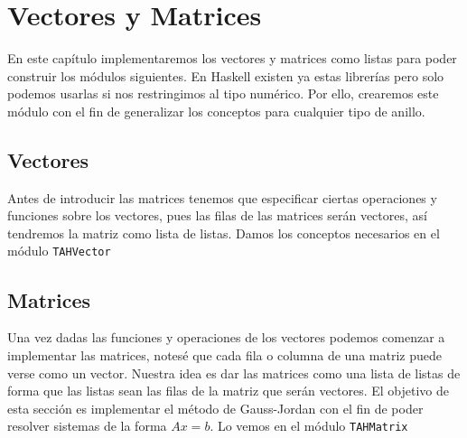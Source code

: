 \chapter{Vectores y Matrices}\label{sec:matrixHas}
En este capítulo implementaremos los vectores y matrices como listas para poder construir los módulos siguientes. En Haskell existen ya estas librerías pero solo podemos usarlas si nos restringimos al tipo numérico. Por ello, crearemos este módulo con el fin de generalizar los conceptos para cualquier tipo de anillo.

\section{Vectores}
Antes de introducir las matrices tenemos que especificar ciertas operaciones y funciones sobre los vectores, pues las filas de las matrices serán vectores, así tendremos la matriz como lista de listas. Damos los conceptos necesarios en el módulo \texttt{TAHVector} 

\section{Matrices}
Una vez dadas las funciones y operaciones de los vectores podemos comenzar a implementar las matrices, notesé que cada fila o columna de una matriz puede verse como un vector. Nuestra idea es dar las matrices como una lista de listas de forma que las listas sean las filas de la matriz que serán vectores. El objetivo de esta sección es implementar el método de Gauss-Jordan con el fin de poder resolver sistemas de la forma $Ax=b$. Lo vemos en el módulo \texttt{TAHMatrix} 